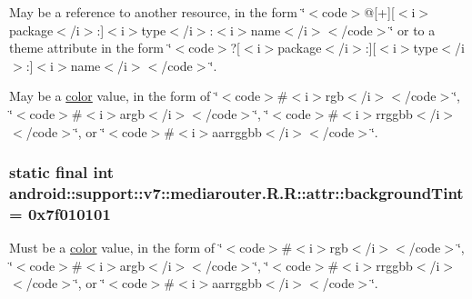 May be a reference to another resource, in the form \char`\"{}$<$code$>$@\mbox{[}+\mbox{]}\mbox{[}$<$i$>$package$<$/i$>$:\mbox{]}$<$i$>$type$<$/i$>$:$<$i$>$name$<$/i$>$$<$/code$>$\char`\"{} or to a theme attribute in the form \char`\"{}$<$code$>$?\mbox{[}$<$i$>$package$<$/i$>$:\mbox{]}\mbox{[}$<$i$>$type$<$/i$>$:\mbox{]}$<$i$>$name$<$/i$>$$<$/code$>$\char`\"{}. 

May be a \hyperlink{classandroid_1_1support_1_1v7_1_1mediarouter_1_1_r_1_1color}{color} value, in the form of \char`\"{}$<$code$>$\#$<$i$>$rgb$<$/i$>$$<$/code$>$\char`\"{}, \char`\"{}$<$code$>$\#$<$i$>$argb$<$/i$>$$<$/code$>$\char`\"{}, \char`\"{}$<$code$>$\#$<$i$>$rrggbb$<$/i$>$$<$/code$>$\char`\"{}, or \char`\"{}$<$code$>$\#$<$i$>$aarrggbb$<$/i$>$$<$/code$>$\char`\"{}. \hypertarget{classandroid_1_1support_1_1v7_1_1mediarouter_1_1_r_1_1attr_e473f4ff3d4d07b9c6dd90c6ba3be78e}{
\subsubsection[{backgroundTint}]{\setlength{\rightskip}{0pt plus 5cm}static final int android::support::v7::mediarouter.R.R::attr::backgroundTint = 0x7f010101}}
\label{classandroid_1_1support_1_1v7_1_1mediarouter_1_1_r_1_1attr_e473f4ff3d4d07b9c6dd90c6ba3be78e}


Must be a \hyperlink{classandroid_1_1support_1_1v7_1_1mediarouter_1_1_r_1_1color}{color} value, in the form of \char`\"{}$<$code$>$\#$<$i$>$rgb$<$/i$>$$<$/code$>$\char`\"{}, \char`\"{}$<$code$>$\#$<$i$>$argb$<$/i$>$$<$/code$>$\char`\"{}, \char`\"{}$<$code$>$\#$<$i$>$rrggbb$<$/i$>$$<$/code$>$\char`\"{}, or \char`\"{}$<$code$>$\#$<$i$>$aarrggbb$<$/i$>$$<$/code$>$\char`\"{}. 

